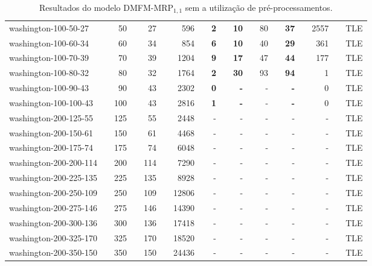 \begin{table}[!ht]
{\begin{tabular}{llrlrlrlrlrlrlrlrlr}
\rowcolor[HTML]{C0C0C0} 
washington-100-50-27 &  & 50 &  & 27 &  & 596 &  & \textbf{2} &  & \textbf{10} &  & 80 &  & \textbf{37} &  & 2557 &  & TLE \\
\rowcolor[HTML]{C0C0C0} 
washington-100-60-34 &  & 60 &  & 34 &  & 854 &  & \textbf{6} &  & \textbf{10} &  & 40 &  & \textbf{29} &  & 361 &  & TLE \\
\rowcolor[HTML]{C0C0C0} 
washington-100-70-39 &  & 70 &  & 39 &  & 1204 &  & \textbf{9} &  & \textbf{17} &  & 47 &  & \textbf{44} &  & 177 &  & TLE \\
\rowcolor[HTML]{C0C0C0} 
washington-100-80-32 &  & 80 &  & 32 &  & 1764 &  & \textbf{2} &  & \textbf{30} &  & 93 &  & \textbf{94} &  & 1 &  & TLE \\
washington-100-90-43 &  & 90 &  & 43 &  & 2302 &  & \textbf{0} &  & \textbf{-} &  & - &  & \textbf{-} &  & 0 &  & TLE \\
washington-100-100-43 &  & 100 &  & 43 &  & 2816 &  & \textbf{1} &  & \textbf{-} &  & - &  & \textbf{-} &  & 0 &  & TLE \\ \hline
washington-200-125-55 &  & 125 &  & 55 &  & 2448 &  & - &  & - &  & - &  & - &  & - &  & TLE \\
washington-200-150-61 &  & 150 &  & 61 &  & 4468 &  & - &  & - &  & - &  & - &  & - &  & TLE \\
washington-200-175-74 &  & 175 &  & 74 &  & 6048 &  & - &  & - &  & - &  & - &  & - &  & TLE \\
washington-200-200-114 &  & 200 &  & 114 &  & 7290 &  & - &  & - &  & - &  & - &  & - &  & TLE \\
washington-200-225-135 &  & 225 &  & 135 &  & 8928 &  & - &  & - &  & - &  & - &  & - &  & TLE \\
washington-200-250-109 &  & 250 &  & 109 &  & 12806 &  & - &  & - &  & - &  & - &  & - &  & TLE \\
washington-200-275-146 &  & 275 &  & 146 &  & 14390 &  & - &  & - &  & - &  & - &  & - &  & TLE \\
washington-200-300-136 &  & 300 &  & 136 &  & 17418 &  & - &  & - &  & - &  & - &  & - &  & TLE \\
washington-200-325-170 &  & 325 &  & 170 &  & 18520 &  & - &  & - &  & - &  & - &  & - &  & TLE \\
washington-200-350-150 &  & 350 &  & 150 &  & 24436 &  & - &  & - &  & - &  & - &  & - &  & TLE \\ \hline
\end{tabular}%
}
\caption{Resultados do  modelo DMFM-MRP$_{1, 1}$ sem a utilização de pré-processamentos.}
\label{tab:dmfm-um-semprep}
\end{table}

